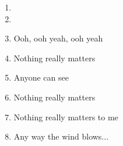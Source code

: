 \documentclass{article}
\begin{document}
\begin{center}
\begin{enumerate}
            \item[]
            \item[] \outro
            \item Ooh, ooh yeah, ooh yeah
            \item Nothing really matters
            \item Anyone can see
            \item Nothing really matters
            \item Nothing really matters to me
            \item Any way the wind blows...

        \end{enumerate}
    \end{center}
\end{document}
